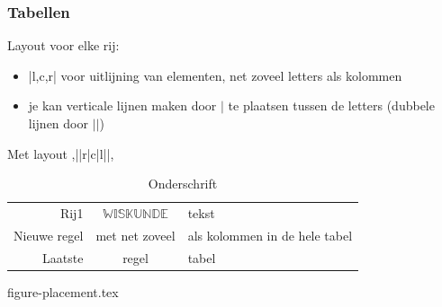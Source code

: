 \documentclass{cursuspresentatie}
\def\importslide#1#2{%
	{#2}
}
\begin{document}
\begin{frame}
	\frametitle{Tabellen}
	Layout voor elke rij:
	\begin{itemize}
		\item \hll|l,c,r| voor uitlijning van elementen, net zoveel letters als kolommen
		\item je kan verticale lijnen maken door $|$ te plaatsen tussen de letters (dubbele lijnen door $||$)
	\end{itemize}
	\begin{block}{Met layout \hll,||r|c|l||,}
		{\begin{table}
				\centering
				\begin{tabular}{||r|c|l||}
					Rij1 & $\mathbb{WISKUNDE}$ & tekst\\
					Nieuwe regel & met net zoveel & als kolommen in de hele tabel\\
					\hline
					Laatste & regel & tabel
				\end{tabular}
				\caption{Onderschrift}
				\label{tab: tabel}
		\end{table}}
	\end{block}
\end{frame}

\importslide{images}{figure-placement.tex}
\end{document}
